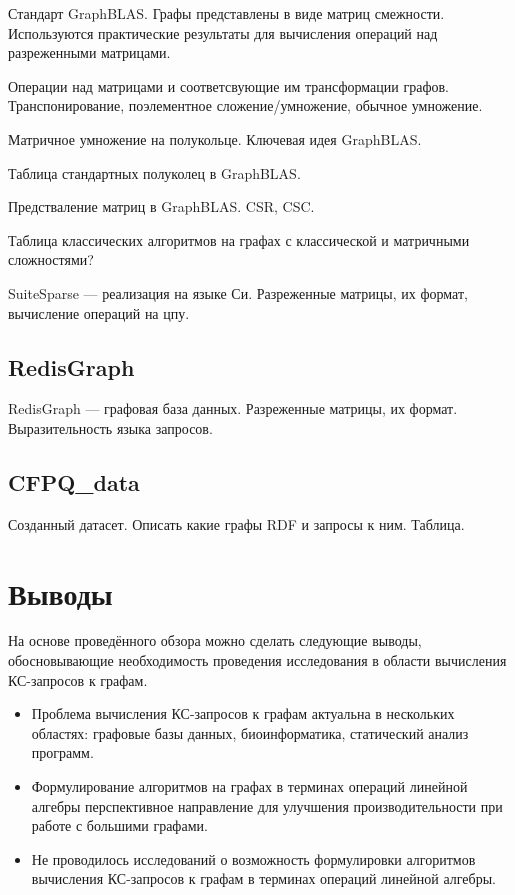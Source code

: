 Стандарт GraphBLAS. Графы представлены в виде матриц смежности. Используются практические результаты для вычисления операций над разреженными матрицами.

Операции над матрицами и соответсвующие им трансформации графов. Транспонирование, поэлементное сложение/умножение, обычное умножение.

Матричное умножение на полукольце. Ключевая идея GraphBLAS.

Таблица стандартных полуколец в GraphBLAS.

Предстваление матриц в GraphBLAS. CSR, CSC.

Таблица классических алгоритмов на графах с классической и матричными сложностями?

SuiteSparse --- реализация на языке Си. Разреженные матрицы, их формат, вычисление операций на цпу.

\subsection{RedisGraph}
RedisGraph --- графовая база данных. Разреженные матрицы, их формат. Выразительность языка запросов.

\subsection{CFPQ\_data}
Созданный датасет. Описать какие графы RDF и запросы к ним. Таблица.

\section{Выводы}\label{sec:ch1/sec6}
На основе проведённого обзора можно сделать следующие выводы, обосновывающие необходимость проведения исследования в области вычисления КС-запросов к графам.
\begin{itemize}
	\item Проблема вычисления КС-запросов к графам актуальна в нескольких областях: графовые базы данных, биоинформатика, статический анализ программ.
	\item Формулирование алгоритмов на графах в терминах операций линейной алгебры перспективное направление для улучшения производительности при работе с большими графами.
	\item Не проводилось исследований о возможность формулировки алгоритмов вычисления КС-запросов к графам в терминах операций линейной алгебры.
\end{itemize}

